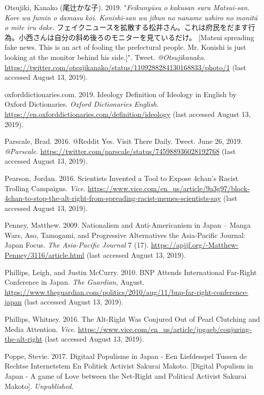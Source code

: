 \documentclass[10pt,british,A4paper,oneside]{memoir}
\begin{document}
\hypertarget{ref-otsujiki_eng._2019}{}
Otsujiki, Kanako (尾辻かな子). 2019. "\emph{Feikunyūsu o kakusan suru Matsui-san. Kore wa fumin o damasu kōi. Konishi-san wa jibun no naname ushiro no monitā o mite iru dake.} フェイクニュースを拡散する松井さん。これは府民をだます行為。小西さんは自分の斜め後ろのモニターを見ているだけ。 [Matsui spreading fake news. This is an act of fooling the prefectural people. Mr. Konishi is just looking at the monitor behind his side.]". Tweet. \emph{@Otsujikanako}.
\url{https://twitter.com/otsujikanako/status/1109288284130168833/photo/1} (last accessed August 13, 2019).

\hypertarget{ref-oxforddictionaries.com_ideology_2019}{}
oxforddictionaries.com. 2019. Ideology Definition of Ideology in English
by Oxford Dictionaries. \emph{Oxford Dictionaries English}.
\url{https://en.oxforddictionaries.com/definition/ideology} (last accessed August 13, 2019).

\hypertarget{ref-parscale_reddit_2016}{}
Parscale, Brad. 2016. @Reddit Yes. Visit There Daily. Tweet. June 26, 2019.
\emph{@Parscale}.
\url{https://twitter.com/parscale/status/745988936028192768} (last accessed August 13, 2019).

\hypertarget{ref-pearson_scientists_2016}{}
Pearson, Jordan. 2016. Scientists Invented a Tool to Expose 4chan's
Racist Trolling Campaigns. \emph{Vice}.
\url{https://www.vice.com/en_us/article/9a3g97/block-4chan-to-stop-the-alt-right-from-spreading-racist-memes-scientists-say} (last accessed August 13, 2019).

\hypertarget{ref-penney_nationalism_2009}{}
Penney, Matthew. 2009. Nationalism and Anti-Americanism in Japan --
Manga Wars, Aso, Tamogami, and Progressive Alternatives the Asia-Pacific
Journal: Japan Focus. \emph{The Asia-Pacific Journal} 7 (17).
\url{https://apjjf.org/-Matthew-Penney/3116/article.html} (last accessed August 13, 2019).

\hypertarget{ref-phillips_bnp_2010}{}
Phillips, Leigh, and Justin McCurry. 2010. BNP Attends International
Far-Right Conference in Japan. \emph{The Guardian}, August.
\url{https://www.theguardian.com/politics/2010/aug/11/bnp-far-right-conference-japan} (last accessed August 13, 2019).

\hypertarget{ref-phillips_alt-right_2016}{}
Phillips, Whitney. 2016. The Alt-Right Was Conjured Out of Pearl
Clutching and Media Attention. \emph{Vice}.
\url{https://www.vice.com/en_us/article/jpgaeb/conjuring-the-alt-right} (last accessed August 13, 2019).

\hypertarget{ref-poppe_digitaal_2017}{}
Poppe, Stevie. 2017. Digitaal Populisme in Japan - Een Liefdesspel Tussen de Rechtse Internetstem En Politiek Activist Sakurai Makoto. [Digital Populism in Japan - A game of Love between the Net-Right and Political Activist Sakurai Makoto].
\emph{Unpublished}.
\end{document}
